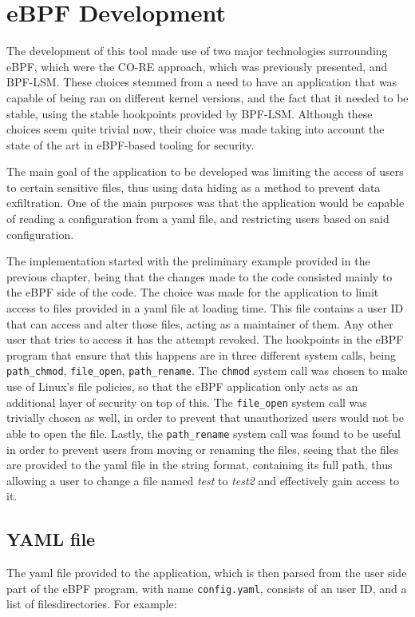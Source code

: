 \section{eBPF Development}
The development of this tool made use of two major technologies surrounding eBPF, which were the CO-RE approach, which was previously presented, and BPF-LSM. These choices stemmed from a need to have an application that was capable of being ran on different kernel versions, and the fact that it needed to be stable, using the stable hookpoints provided by BPF-LSM.
Although these choices seem quite trivial now, their choice was made taking into account the state of the art in eBPF-based tooling for security.

The main goal of the application to be developed was limiting the access of users to certain sensitive files, thus using data hiding as a method to prevent data exfiltration. One of the main purposes was that the application would be capable of reading a configuration from a yaml file, and restricting users based on said configuration.

The implementation started with the preliminary example provided in the previous chapter, being that the changes made to the code consisted mainly to the eBPF side of the code.
The choice was made for the application to limit access to files provided in a yaml file at loading time. This file contains a user ID that can access and alter those files, acting as a maintainer of them. Any other user that tries to access it has the attempt revoked. The hookpoints in the eBPF program that ensure that this happens are in three different system calls, being \texttt{path\_chmod}, \texttt{file\_open}, \texttt{path\_rename}. The \texttt{chmod} system call was chosen to make use of Linux's file policies, so that the eBPF application only acts as an additional layer of security on top of this. The \texttt{file\_open} system call was trivially chosen as well, in order to prevent that unauthorized users would not be able to open the file. Lastly, the \texttt{path\_rename} system call was found to be useful in order to prevent users from moving or renaming the files, seeing that the files are provided to the yaml file in the string format, containing its full path, thus allowing a user to change a file named \textit{test} to \textit{test2} and effectively gain access to it.

\subsection{YAML file}
The yaml file provided to the application, which is then parsed from the user side part of the eBPF program, with name \texttt{config.yaml}, consists of an user ID, and a list of files\/directories. For example:

